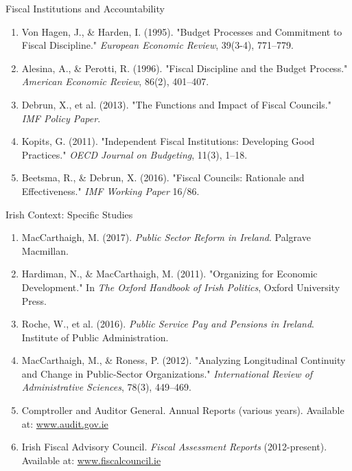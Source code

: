 \documentclass[10pt]{beamer}
\begin{document}
\begin{frame}{Fiscal Institutions and Accountability}
\footnotesize
\begin{enumerate}
\item Von Hagen, J., \& Harden, I. (1995). "Budget Processes and Commitment to Fiscal Discipline." \emph{European Economic Review}, 39(3-4), 771–779.
\item Alesina, A., \& Perotti, R. (1996). "Fiscal Discipline and the Budget Process." \emph{American Economic Review}, 86(2), 401–407.
\item Debrun, X., et al. (2013). "The Functions and Impact of Fiscal Councils." \emph{IMF Policy Paper}.
\item Kopits, G. (2011). "Independent Fiscal Institutions: Developing Good Practices." \emph{OECD Journal on Budgeting}, 11(3), 1–18.
\item Beetsma, R., \& Debrun, X. (2016). "Fiscal Councils: Rationale and Effectiveness." \emph{IMF Working Paper} 16/86.
\end{enumerate}
\end{frame}

\begin{frame}{Irish Context: Specific Studies}
\footnotesize
\begin{enumerate}
\item MacCarthaigh, M. (2017). \emph{Public Sector Reform in Ireland}. Palgrave Macmillan.
\item Hardiman, N., \& MacCarthaigh, M. (2011). "Organizing for Economic Development." In \emph{The Oxford Handbook of Irish Politics}, Oxford University Press.
\item Roche, W., et al. (2016). \emph{Public Service Pay and Pensions in Ireland}. Institute of Public Administration.
\item MacCarthaigh, M., \& Roness, P. (2012). "Analyzing Longitudinal Continuity and Change in Public-Sector Organizations." \emph{International Review of Administrative Sciences}, 78(3), 449–469.
\item Comptroller and Auditor General. Annual Reports (various years). Available at: \href{https://www.audit.gov.ie}{www.audit.gov.ie}
\item Irish Fiscal Advisory Council. \emph{Fiscal Assessment Reports} (2012-present). Available at: \href{https://www.fiscalcouncil.ie}{www.fiscalcouncil.ie}
\end{enumerate}
\end{frame}
\end{document}
